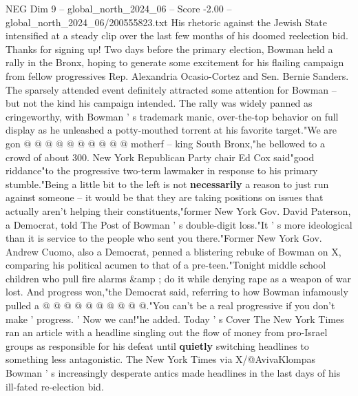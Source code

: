 \begin{textsample}{NEG Dim 9 – global\_north\_2024\_06 – Score -2.00 – global\_north\_2024\_06/200555823.txt}
His rhetoric against the Jewish State intensified at a steady clip over the last few months of his doomed reelection bid.
Thanks for signing up!
Two days before the primary election, Bowman held a rally in the Bronx, hoping to generate some excitement for his flailing campaign from fellow progressives Rep.
Alexandria Ocasio-Cortez and Sen.
Bernie Sanders.
The sparsely attended event definitely attracted some attention for Bowman -- but not the kind his campaign intended.
The rally was widely panned as cringeworthy, with Bowman ' s trademark manic, over-the-top behavior on full display as he unleashed a potty-mouthed torrent at his favorite target."We are gon @ @ @ @ @ @ @ @ @ @ motherf -- king South Bronx,"he bellowed to a crowd of about 300.
New York Republican Party chair Ed Cox said"good riddance"to the progressive two-term lawmaker in response to his primary stumble."Being a little bit to the left is not \textbf{necessarily} a reason to just run against someone -- it would be that they are taking positions on issues that actually aren't helping their constituents,"former New York Gov.
David Paterson, a Democrat, told The Post of Bowman ' s double-digit loss."It ' s more ideological than it is service to the people who sent you there."Former New York Gov.
Andrew Cuomo, also a Democrat, penned a blistering rebuke of Bowman on X, comparing his political acumen to that of a pre-teen."Tonight middle school children who pull fire alarms \&amp ; do it while denying rape as a weapon of war lost.
And progress won,"the Democrat said, referring to how Bowman infamously pulled a @ @ @ @ @ @ @ @ @ @."You can't be a real progressive if you don't make ' progress. ' Now we can!"he added.
Today ' s Cover The New York Times ran an article with a headline singling out the flow of money from pro-Israel groups as responsible for his defeat until \textbf{quietly} switching headlines to something less antagonistic.
The New York Times via X/@AvivaKlompas Bowman ' s increasingly desperate antics made headlines in the last days of his ill-fated re-election bid.

\end{textsample}
